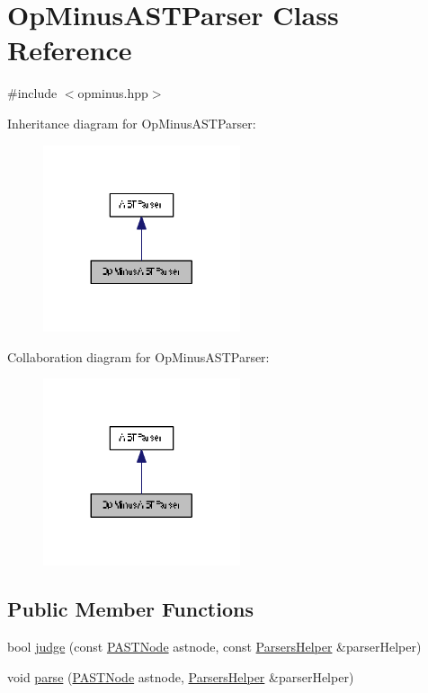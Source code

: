 \hypertarget{class_op_minus_a_s_t_parser}{}\section{Op\+Minus\+A\+S\+T\+Parser Class Reference}
\label{class_op_minus_a_s_t_parser}


{\ttfamily \#include $<$opminus.\+hpp$>$}



Inheritance diagram for Op\+Minus\+A\+S\+T\+Parser\+:
\nopagebreak
\begin{figure}[H]
\begin{center}
\leavevmode
\includegraphics[width=164pt]{class_op_minus_a_s_t_parser__inherit__graph}
\end{center}
\end{figure}


Collaboration diagram for Op\+Minus\+A\+S\+T\+Parser\+:
\nopagebreak
\begin{figure}[H]
\begin{center}
\leavevmode
\includegraphics[width=164pt]{class_op_minus_a_s_t_parser__coll__graph}
\end{center}
\end{figure}
\subsection*{Public Member Functions}
\begin{DoxyCompactItemize}
\item 
bool \hyperlink{class_op_minus_a_s_t_parser_a053657883000f312f7e4fdce48d4b1af}{judge} (const \hyperlink{ast_8hpp_ab65291a3ef1ea9ec8e3d396783b77e46}{P\+A\+S\+T\+Node} astnode, const \hyperlink{class_parsers_helper}{Parsers\+Helper} \&parser\+Helper)
\item 
void \hyperlink{class_op_minus_a_s_t_parser_a3ab524f258bae905a075ad004d69c918}{parse} (\hyperlink{ast_8hpp_ab65291a3ef1ea9ec8e3d396783b77e46}{P\+A\+S\+T\+Node} astnode, \hyperlink{class_parsers_helper}{Parsers\+Helper} \&parser\+Helper)
\end{DoxyCompactItemize}


